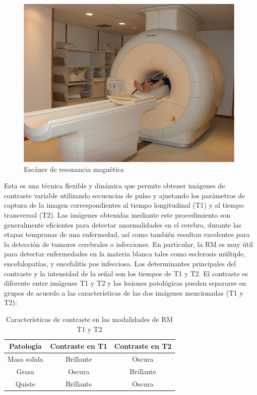 \begin{figure}[H]
\centering
\includegraphics[scale=0.3]{images/scanner.jpg}
\caption{Escáner de resonancia magnética}
\label{fig:scanner:mri}
\end{figure}

Esta es una técnica flexible y dinámica que permite obtener imágenes de contraste variable utilizando secuencias de pulso y ajustando los parámetros de captura de la imagen correspondientes al tiempo longitudinal (T1) y al tiempo transversal (T2). Las imágenes obtenidas mediante este procedimiento son generalmente eficientes para detectar anormalidades en el cerebro, durante las etapas tempranas de una enfermedad, así como también resultan excelentes para la detección de tumores cerebrales o infecciones. En particular, la RM es muy útil para detectar enfermedades en la materia blanca tales como esclerosis múltiple, encefalopatías, y encefalitis pos infecciosa. Los determinantes principales del contraste y la intensidad de la señal son los tiempos de T1 y T2. El contraste es diferente entre imágenes T1 y T2 y las lesiones patológicas pueden separarse en grupos de acuerdo a las características de las dos imágenes mencionadas (T1 y T2):


\begin{table}[H]
	\centering
	\begin{tabular}{c|c c}
	Patología & Contraste en T1 & Contraste en T2   \\ 
	\hline Masa solida & Brillante & Oscura  \\ 
	Grasa & Oscura & Brillante  \\ 
	Quiste &	Brillante &	Oscura  \\ 
	\end{tabular}
	\caption{Características de contraste en las modalidades de RM T1 y T2}
	\label{tab:colores_por_MRI}
\end{table}

